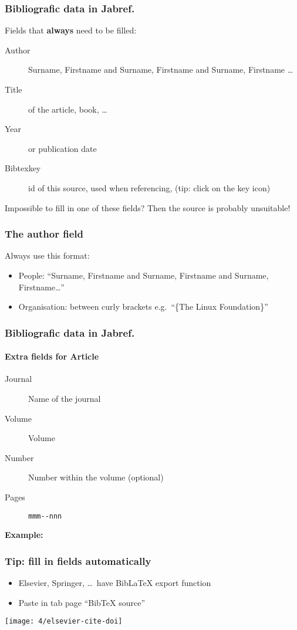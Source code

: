 \documentclass[aspectratio=169]{beamer}
\begin{document}
\begin{frame}
  \frametitle{Bibliografic data in Jabref.}

  Fields that \textbf{always} need to be filled:

  \begin{description}
    \item[Author] Surname, Firstname and Surname, Firstname and Surname, Firstname \ldots
    \item[Title] of the article, book, \ldots
    \item[Year] or publication date
    \item[Bibtexkey] id of this source, used when referencing, (tip: click on the key icon)
  \end{description}
  \bigskip
  Impossible to fill in one of these fields? Then the source is probably unsuitable!
\end{frame}

\begin{frame}
  \frametitle{The author field}

  Always use this format:

  \begin{itemize}
    \item People: ``Surname, Firstname and Surname, Firstname and Surname, Firstname\ldots''
    \item Organisation: between curly brackets e.g.\ ``\{The Linux Foundation\}''
  \end{itemize}

\end{frame}

\begin{frame}[fragile]
  \frametitle{Bibliografic data in Jabref.}
  \framesubtitle{Extra fields for Article}

  \begin{description}
    \item[Journal] Name of the journal
    \item[Volume] Volume
    \item[Number] Number within the volume (optional)
    \item[Pages] \verb|mmm--nnn|
  \end{description}

  \bigskip

  \textbf{Example:}

\end{frame}

\begin{frame}
  \frametitle{Tip: fill in fields automatically}

  \begin{itemize}
    \item Elsevier, Springer, \ldots\ have Bib\LaTeX{} export function
    \item Paste in tab page ``BibTeX source''
  \end{itemize}

  \bigskip

  \centering
  \texttt{[image: 4/elsevier-cite-doi]}

\end{frame}
\end{document}
